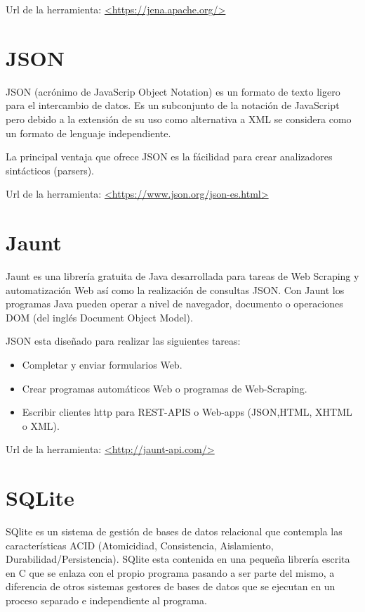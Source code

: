 Url de la herramienta: \url{<https://jena.apache.org/>}

\newpage
\section{JSON}

JSON (acrónimo de JavaScrip Object Notation) es un formato de texto ligero para el intercambio de datos. Es un subconjunto de la notación de JavaScript pero debido a la extensión de su uso como alternativa a XML se considera como un formato de lenguaje independiente.

La principal ventaja que ofrece JSON es la fácilidad para crear analizadores sintácticos (parsers). \cite{wiki:JSON}

Url de la herramienta: \url{<https://www.json.org/json-es.html>}

\section{Jaunt}

Jaunt es una librería gratuita de Java desarrollada para tareas de Web Scraping y automatización Web así como la realización de consultas JSON. Con Jaunt los programas Java pueden operar a nivel de navegador, documento o operaciones DOM (del inglés Document Object Model).

JSON esta diseñado para realizar las siguientes tareas:
\begin{itemize}
	\item{Completar y enviar formularios Web.}
	\item{Crear programas automáticos Web o programas de Web-Scraping.}
	\item{Escribir clientes http para REST-APIS o Web-apps (JSON,HTML,
	XHTML o XML).}
\end{itemize}

Url de la herramienta: \url{<http://jaunt-api.com/>}
\section{SQLite}

SQlite es un sistema de gestión de bases de datos relacional que contempla las características ACID (Atomicidiad, Consistencia, Aislamiento, Durabilidad/Persistencia). SQlite esta contenida en una pequeña librería escrita en C que se enlaza con el propio programa pasando a ser parte del mismo, a diferencia de otros sistemas gestores de bases de datos que se ejecutan en un proceso separado e independiente al programa.

